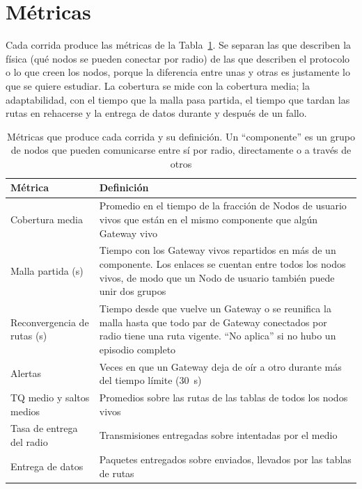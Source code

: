 \section{Métricas}
\label{sec:metricas}

Cada corrida produce las métricas de la Tabla~\ref{tab:metricas}. Se separan
las que describen la física (qué nodos se pueden conectar por radio) de las que
describen el protocolo o lo que creen los nodos, porque la diferencia entre unas
y otras es justamente lo que se quiere estudiar. La cobertura se mide con la
cobertura media; la adaptabilidad, con el tiempo que la malla pasa partida, el
tiempo que tardan las rutas en rehacerse y la entrega de datos durante y después
de un fallo.

\begin{table}[htbp!]
    \centering
    \caption{Métricas que produce cada corrida y su definición. Un ``componente'' es un grupo de nodos que pueden comunicarse entre sí por radio, directamente o a través de otros}
    \label{tab:metricas}
    \footnotesize
    \begin{tabular}{|p{3.5cm}|p{10.7cm}|}
        \hline
        \textbf{Métrica} & \textbf{Definición} \\
        \hline
        Cobertura media & Promedio en el tiempo de la fracción de Nodos de usuario vivos que están en el mismo componente que algún Gateway vivo \\
        \hline
        Malla partida (s) & Tiempo con los Gateway vivos repartidos en más de un componente. Los enlaces se cuentan entre todos los nodos vivos, de modo que un Nodo de usuario también puede unir dos grupos \\
        \hline
        Reconvergencia de rutas (s) & Tiempo desde que vuelve un Gateway o se reunifica la malla hasta que todo par de Gateway conectados por radio tiene una ruta vigente. ``No aplica'' si no hubo un episodio completo \\
        \hline
        Alertas & Veces en que un Gateway deja de oír a otro durante más del tiempo límite (30~s) \\
        \hline
        TQ medio y saltos medios & Promedios sobre las rutas de las tablas de todos los nodos vivos \\
        \hline
        Tasa de entrega del radio & Transmisiones entregadas sobre intentadas por el medio \\
        \hline
        Entrega de datos & Paquetes entregados sobre enviados, llevados por las tablas de rutas \\

\end{tabular}
\end{table}
